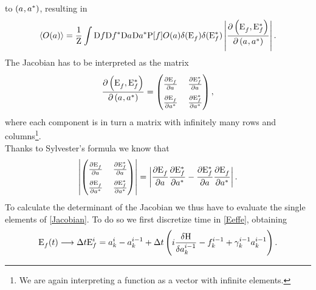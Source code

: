 to $\left( a^{}, a^{*}\right)$, resulting in 
\begin{equation}
    \langle O(a) \rangle = \frac{1}{\mathrm{Z}}\int \mathrm{D} f \mathrm{D} f^* \mathrm{D} a^{} \mathrm{D}a^{*}  \mathrm{P}[f] O(a)\delta(\mathrm{E}_f^{})\delta(\mathrm{E}_f^*)
    \left| \frac{\partial \left( \mathrm{E}_f^{},\mathrm{E}_f^*\right)}{\partial \left( a^{}, a^{*}\right)}\right|.
    \label{expect1}
\end{equation}
The Jacobian has to be interpreted as the matrix 
\begin{equation}
     \frac{\partial \left( \Ef,\Efstar\right)}{\partial \left( \anorm, \astar\right)} = 
    \renewcommand{\arraystretch}{1.8}  %
    \setlength{\arraycolsep}{6pt}     %
    \begin{pmatrix}
        \frac{\partial \Ef}{\partial \anorm}  & \frac{\partial \Efstar}{\partial \anorm} \\
        \frac{\partial \Ef}{\partial \astar}  & \frac{\partial \Efstar}{\partial \astar}
    \end{pmatrix}
,
\label{Jacobian}
\end{equation}
where each component is in turn a matrix with infinitely many rows and columns\footnote{We are again interpreting a function as a vector with infinite elements.}. \\
Thanks to Sylvester's formula we know that 
\begin{equation}
    \renewcommand{\arraystretch}{1.8}  %
    \setlength{\arraycolsep}{6pt}     %
    \left|
    \begin{pmatrix}
        \frac{\partial \Ef}{\partial \anorm}  & \frac{\partial \Efstar}{\partial \anorm} \\
        \frac{\partial \Ef}{\partial \astar}  & \frac{\partial \Efstar}{\partial \astar}
    \end{pmatrix}
    \right|
    = \left| \frac{\partial \Ef}{\partial \anorm} \frac{\partial \Efstar}{\partial \astar} - \frac{\partial \Efstar}{\partial \anorm} 
    \frac{\partial \Ef}{\partial \astar}\right|.
    \label{sylvester}
\end{equation}
To calculate the determinant of the Jacobian we thus have to evaluate the single elements of \eqref{Jacobian}. To do so we first discretize time in \eqref{Eeffe}, obtaining
\begin{equation}
    \mathrm{E}_f^{} (t) \longrightarrow \Delta t \mathrm{E}_f^{i} = a_k^i - a_k^{i-1} + 
    \Delta t\left(i \frac{\delta \mathrm{H}}{\delta a_k^{i-1}} - f_k^{i-1} + \gamma_k^{i-1}a_k^{i-1}\right).
    \label{discretization}
\end{equation}

